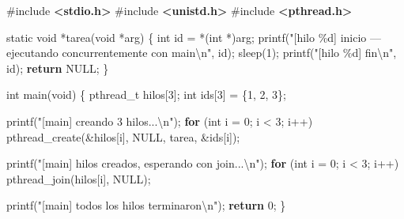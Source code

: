 \documentclass[
  spanish,
]{article}
\newenvironment{Shaded}{}{}
\newcommand{\ControlFlowTok}[1]{\textcolor[rgb]{0.00,0.44,0.13}{\textbf{#1}}}
\newcommand{\DataTypeTok}[1]{\textcolor[rgb]{0.56,0.13,0.00}{#1}}
\newcommand{\DecValTok}[1]{\textcolor[rgb]{0.25,0.63,0.44}{#1}}
\newcommand{\ImportTok}[1]{\textcolor[rgb]{0.00,0.50,0.00}{\textbf{#1}}}
\newcommand{\NormalTok}[1]{#1}
\newcommand{\OperatorTok}[1]{\textcolor[rgb]{0.40,0.40,0.40}{#1}}
\newcommand{\PreprocessorTok}[1]{\textcolor[rgb]{0.74,0.48,0.00}{#1}}
\newcommand{\SpecialCharTok}[1]{\textcolor[rgb]{0.25,0.44,0.63}{#1}}
\newcommand{\StringTok}[1]{\textcolor[rgb]{0.25,0.44,0.63}{#1}}
\begin{document}
\begin{Shaded}
\begin{Highlighting}[]
\PreprocessorTok{\#include }\ImportTok{\textless{}stdio.h\textgreater{}}
\PreprocessorTok{\#include }\ImportTok{\textless{}unistd.h\textgreater{}}
\PreprocessorTok{\#include }\ImportTok{\textless{}pthread.h\textgreater{}}

\DataTypeTok{static} \DataTypeTok{void} \OperatorTok{*}\NormalTok{tarea}\OperatorTok{(}\DataTypeTok{void} \OperatorTok{*}\NormalTok{arg}\OperatorTok{)} \OperatorTok{\{}
    \DataTypeTok{int}\NormalTok{ id }\OperatorTok{=} \OperatorTok{*(}\DataTypeTok{int} \OperatorTok{*)}\NormalTok{arg}\OperatorTok{;}
\NormalTok{    printf}\OperatorTok{(}\StringTok{"[hilo }\SpecialCharTok{\%d}\StringTok{] inicio — ejecutando concurrentemente con main}\SpecialCharTok{\textbackslash{}n}\StringTok{"}\OperatorTok{,}\NormalTok{ id}\OperatorTok{);}
\NormalTok{    sleep}\OperatorTok{(}\DecValTok{1}\OperatorTok{);}
\NormalTok{    printf}\OperatorTok{(}\StringTok{"[hilo }\SpecialCharTok{\%d}\StringTok{] fin}\SpecialCharTok{\textbackslash{}n}\StringTok{"}\OperatorTok{,}\NormalTok{ id}\OperatorTok{);}
    \ControlFlowTok{return}\NormalTok{ NULL}\OperatorTok{;}
\OperatorTok{\}}

\DataTypeTok{int}\NormalTok{ main}\OperatorTok{(}\DataTypeTok{void}\OperatorTok{)} \OperatorTok{\{}
\NormalTok{    pthread\_t hilos}\OperatorTok{[}\DecValTok{3}\OperatorTok{];}
    \DataTypeTok{int}\NormalTok{ ids}\OperatorTok{[}\DecValTok{3}\OperatorTok{]} \OperatorTok{=} \OperatorTok{\{}\DecValTok{1}\OperatorTok{,} \DecValTok{2}\OperatorTok{,} \DecValTok{3}\OperatorTok{\};}

\NormalTok{    printf}\OperatorTok{(}\StringTok{"[main] creando 3 hilos...}\SpecialCharTok{\textbackslash{}n}\StringTok{"}\OperatorTok{);}
    \ControlFlowTok{for} \OperatorTok{(}\DataTypeTok{int}\NormalTok{ i }\OperatorTok{=} \DecValTok{0}\OperatorTok{;}\NormalTok{ i }\OperatorTok{\textless{}} \DecValTok{3}\OperatorTok{;}\NormalTok{ i}\OperatorTok{++)}
\NormalTok{        pthread\_create}\OperatorTok{(\&}\NormalTok{hilos}\OperatorTok{[}\NormalTok{i}\OperatorTok{],}\NormalTok{ NULL}\OperatorTok{,}\NormalTok{ tarea}\OperatorTok{,} \OperatorTok{\&}\NormalTok{ids}\OperatorTok{[}\NormalTok{i}\OperatorTok{]);}

\NormalTok{    printf}\OperatorTok{(}\StringTok{"[main] hilos creados, esperando con join...}\SpecialCharTok{\textbackslash{}n}\StringTok{"}\OperatorTok{);}
    \ControlFlowTok{for} \OperatorTok{(}\DataTypeTok{int}\NormalTok{ i }\OperatorTok{=} \DecValTok{0}\OperatorTok{;}\NormalTok{ i }\OperatorTok{\textless{}} \DecValTok{3}\OperatorTok{;}\NormalTok{ i}\OperatorTok{++)}
\NormalTok{        pthread\_join}\OperatorTok{(}\NormalTok{hilos}\OperatorTok{[}\NormalTok{i}\OperatorTok{],}\NormalTok{ NULL}\OperatorTok{);}

\NormalTok{    printf}\OperatorTok{(}\StringTok{"[main] todos los hilos terminaron}\SpecialCharTok{\textbackslash{}n}\StringTok{"}\OperatorTok{);}
    \ControlFlowTok{return} \DecValTok{0}\OperatorTok{;}
\OperatorTok{\}}
\end{Highlighting}
\end{Shaded}
\end{document}
